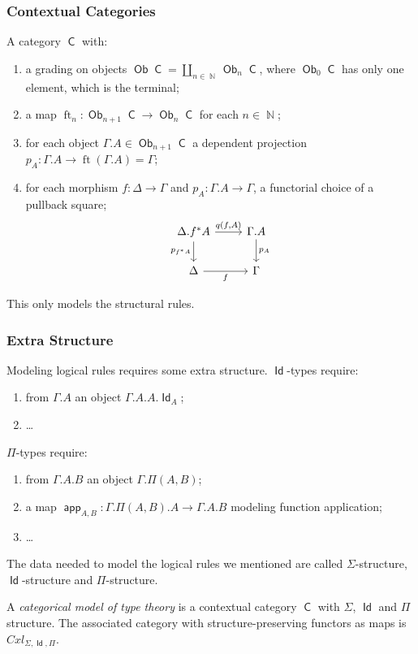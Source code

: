 \documentclass{beamer}
\DeclareMathOperator{\Id}{\mathsf{Id}}
\DeclareMathOperator{\sfC}{\mathsf{C}}
\DeclareMathOperator{\N}{\mathbb{N}}
\DeclareMathOperator{\Ob}{\mathsf{Ob}}
\DeclareMathOperator{\ft}{ft}
\DeclareMathOperator{\app}{\mathsf{app}}
\begin{document}
\begin{frame}
  \frametitle{Contextual Categories}

  \begin{definition}
    A category $\sfC$ with:
    \begin{enumerate}
      \item a grading on objects $\Ob\sfC=\coprod_{n\in\N}\Ob_n\sfC$, where
        $\Ob_0\sfC$ has only one element, which is the terminal;
      \item a map $\ft_n\colon\Ob_{n+1}\sfC\rightarrow\Ob_n\sfC$ for each
        $n\in\N$;
      \item for each object $\Gamma.A\in\Ob_{n+1}\sfC$ a dependent projection
        $p_A\colon\Gamma.A\rightarrow\ft(\Gamma.A)=\Gamma$;
      \item for each morphism $f\colon\Delta\rightarrow\Gamma$ and
        $p_A\colon\Gamma.A\rightarrow\Gamma$, a functorial choice of a pullback
        square;
        \[\begin{tikzcd}[ampersand replacement=\&]
          {\Delta.f^*A} \& {\Gamma.A} \\
          \Delta \& \Gamma
          \arrow["{p_A}", from=1-2, to=2-2]
          \arrow["{p_{f^*A}}"', from=1-1, to=2-1]
          \arrow["{q(f,A)}", from=1-1, to=1-2]
          \arrow["f"', from=2-1, to=2-2]
        \end{tikzcd}\]
    \end{enumerate}
  \end{definition}
  
  This only models the structural rules.
\end{frame}

\begin{frame}
  \frametitle{Extra Structure}
  Modeling logical rules requires some extra structure. $\Id$-types require:
  \begin{enumerate}
    \item from $\Gamma.A$ an object $\Gamma.A.A.\Id_A$;
    \item \ldots
  \end{enumerate}
  $\Pi$-types require:
  \begin{enumerate}
    \item from $\Gamma.A.B$ an object $\Gamma.\Pi(A,B)$;
    \item a map $\app_{A,B}\colon\Gamma.\Pi(A,B).A\rightarrow\Gamma.A.B$
      modeling function application;
    \item \ldots
  \end{enumerate}
  The data needed to model the logical rules we mentioned are
  called $\Sigma$-structure, $\Id$-structure and $\Pi$-structure.

  \begin{defn}
    A \emph{categorical model of type theory} is a contextual category $\sfC$
    with $\Sigma$, $\Id$ and $\Pi$ structure. The associated category with
    structure-preserving functors as maps is $Cxl_{\Sigma,\Id,\Pi}$.
  \end{defn}
\end{frame}
\end{document}
